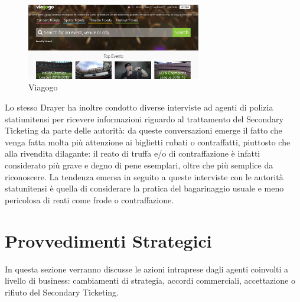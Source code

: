 \begin{figure}[H]
	\centering
	\includegraphics[width=0.68\textwidth]{chapter3/immagini/viagogo_disclaimer}
	\caption{Viagogo}
	\label{viagogo}
\end{figure}
Lo stesso Drayer ha inoltre condotto diverse interviste ad agenti di polizia statiunitensi per ricevere informazioni riguardo al trattamento del Secondary Ticketing da parte delle autorità: da queste conversazioni emerge il fatto che venga fatta molta più attenzione ai biglietti rubati o contraffatti, piuttosto che alla rivendita dilagante: il reato di truffa e/o di contraffazione è infatti considerato più grave e degno di pene esemplari, oltre che più semplice da riconoscere. La tendenza emersa in seguito a queste interviste con le autorità  statunitensi è quella di considerare la pratica del bagarinaggio usuale e meno pericolosa di reati come frode o contraffazione. 

\section{Provvedimenti Strategici}
In questa sezione verranno discusse le azioni intraprese dagli agenti coinvolti a livello di business: cambiamenti di strategia, accordi commerciali, accettazione o rifiuto del Secondary Ticketing. 
